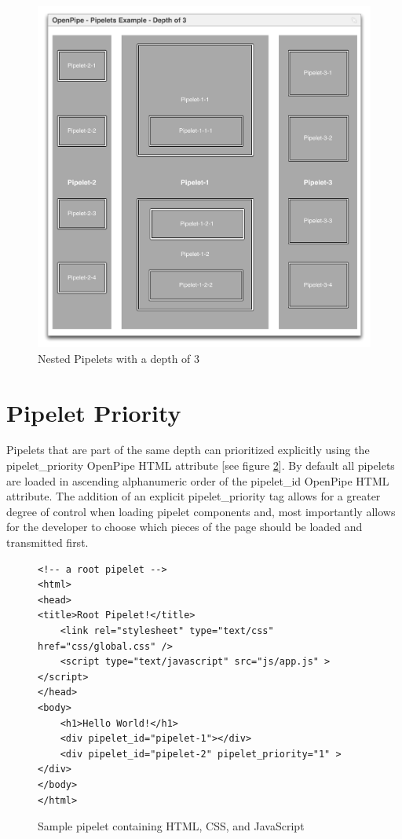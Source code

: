 \documentclass[12pt]{report}
\begin{document}
\begin{figure}[H]
\caption{Nested Pipelets with a depth of 3}
\label{fig:nestedPipelets}
\centering
\includegraphics[width=\textwidth,keepaspectratio]{figures/images/nested_pipelets.pdf}
\end{figure}

\section{Pipelet Priority}

Pipelets that are part of the same depth can prioritized explicitly using the pipelet\_priority OpenPipe HTML attribute [see figure \ref{fig:pipeletPriority}]. By default all pipelets are loaded in ascending alphanumeric order of the pipelet\_id OpenPipe HTML attribute. The addition of an explicit pipelet\_priority tag allows for a greater degree of control when loading pipelet components and, most importantly allows for the developer to choose which pieces of the page should be loaded and transmitted first.

\begin{figure}[H]
\caption{Sample pipelet containing HTML, CSS, and JavaScript}
\label{fig:pipeletPriority}
\begin{lstlisting}
<!-- a root pipelet -->
<html>
<head>
<title>Root Pipelet!</title>
	<link rel="stylesheet" type="text/css" href="css/global.css" />
	<script type="text/javascript" src="js/app.js" ></script>
</head>
<body>
	<h1>Hello World!</h1>
	<div pipelet_id="pipelet-1"></div>
	<div pipelet_id="pipelet-2" pipelet_priority="1" ></div>
</body>
</html>
\end{lstlisting}
\end{figure}
\end{document}
